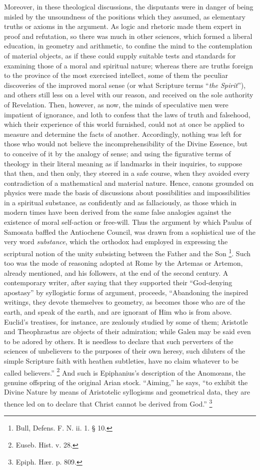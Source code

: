 Moreover, in these theological discussions, the disputants were in
danger of being misled by the unsoundness of the positions which they
assumed, as elementary truths or axioms in the argument. As logic and
rhetoric made them expert in proof and refutation, so there was much
in other sciences, which formed a liberal education, in geometry and
arithmetic, to confine the mind to the contemplation of material
objects, as if these could supply suitable tests and standards for
examining those of a moral and spiritual nature; whereas there are
truths foreign to the province of the most exercised intellect, some
of them the peculiar discoveries of the improved moral sense (or what
Scripture terms ``\emph{the Spirit}''), and others still less
on a level with our reason, and received on the sole authority of
Revelation. Then, however, as now, the minds of speculative men were
impatient of ignorance, and loth to confess that the laws of truth and
falsehood, which their experience of this world furnished, could not
at once be applied to measure and determine the facts of another.
Accordingly, nothing was left for those who would not believe the
incomprehensibility of the Divine Essence, but to conceive of it by
the analogy of sense; and using the figurative terms of theology in
their literal meaning as if landmarks in their inquiries, to suppose
that then, and then only, they steered in a safe course, when they
avoided every contradiction of a mathematical and material nature.
Hence, canons grounded on physics were made the basis of discussions
about possibilities and impossibilities in a spiritual substance, as
confidently and as fallaciously, as those which in modern times have
been derived from the same false analogies against the existence of
moral self-action or free-will. Thus the argument by which Paulus of
Samosata baffled the Antiochene Council, was drawn from a sophistical
use of the very word \emph{substance}, which the orthodox had employed in
expressing the scriptural notion of the unity subsisting between the
Father and the Son \footnote{Bull, Defens. F. N. ii. 1. § 10.}. Such too was the mode of reasoning
adopted at Rome by the Artemas or Artemon, already mentioned, and his
followers, at the end of the second century. A contemporary writer,
after saying that they supported their ``God-denying
apostasy'' by syllogistic forms of argument, proceeds,
``Abandoning the inspired writings, they devote themselves to
geometry, as becomes those who are of the earth, and speak of the
earth, and are ignorant of Him who is from above. Euclid's treatises,
for instance, are zealously studied by some of them; Aristotle and
Theophrastus are objects of their admiration; while Galen may be said even to be adored by others. It is needless to declare that such
perverters of the sciences of unbelievers to the purposes of their own
heresy, such diluters of the simple Scripture faith with heathen
subtleties, have no claim whatever to be called believers.'' \footnote{Euseb. Hist. v. 28.} And such is Epiphanius's description of the Anomœans, the genuine
offspring of the original Arian stock. ``Aiming,'' he says,
``to exhibit the Divine Nature by means of Aristotelic syllogisms
and geometrical data, they are thence led on to declare that Christ
cannot be derived from God.'' \footnote{Epiph. Hær. p. 809.}

